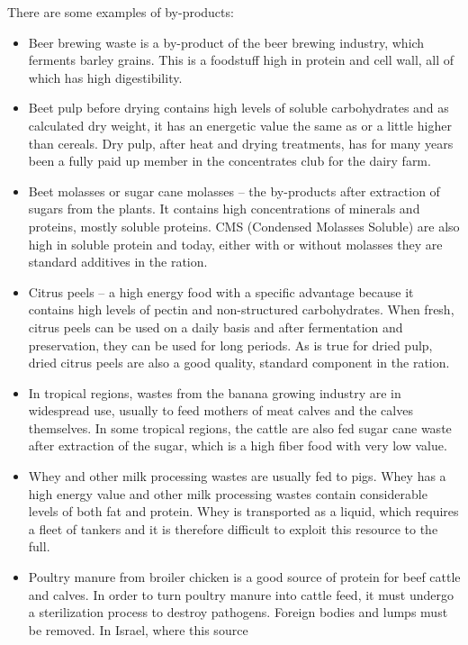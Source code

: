 \documentclass[]{book}
\begin{document}
There are some examples of by-products:

\begin{itemize}
\item
  Beer brewing waste is a by-product of the beer brewing industry, which
  ferments barley grains. This is a foodstuff high in protein and cell
  wall, all of which has high digestibility.
\item
  Beet pulp before drying contains high levels of soluble carbohydrates
  and as calculated dry weight, it has an energetic value the same as or
  a little higher than cereals. Dry pulp, after heat and drying
  treatments, has for many years been a fully paid up member in the
  concentrates club for the dairy farm.
\item
  Beet molasses or sugar cane molasses -- the by-products after
  extraction of sugars from the plants. It contains high concentrations
  of minerals and proteins, mostly soluble proteins. CMS (Condensed
  Molasses Soluble) are also high in soluble protein and today, either
  with or without molasses they are standard additives in the ration.
\item
  Citrus peels -- a high energy food with a specific advantage because
  it contains high levels of pectin and non-structured carbohydrates.
  When fresh, citrus peels can be used on a daily basis and after
  fermentation and preservation, they can be used for long periods. As
  is true for dried pulp, dried citrus peels are also a good quality,
  standard component in the ration.
\item
  In tropical regions, wastes from the banana growing industry are in
  widespread use, usually to feed mothers of meat calves and the calves
  themselves. In some tropical regions, the cattle are also fed sugar
  cane waste after extraction of the sugar, which is a high fiber food
  with very low value.
\item
  Whey and other milk processing wastes are usually fed to pigs. Whey
  has a high energy value and other milk processing wastes contain
  considerable levels of both fat and protein. Whey is transported as a
  liquid, which requires a fleet of tankers and it is therefore
  difficult to exploit this resource to the full.
\item
  Poultry manure from broiler chicken is a good source of protein for
  beef cattle and calves. In order to turn poultry manure into cattle
  feed, it must undergo a sterilization process to destroy pathogens.
  Foreign bodies and lumps must be removed. In Israel, where this source

\end{itemize}
\end{document}

